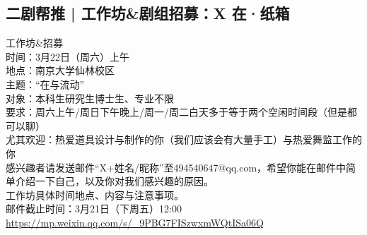 \documentclass[letterpaper, 12pt]{article}
\begin{document}
\begin{multicols}{2}
\subsection{二剧帮推 | 工作坊&剧组招募：X 在·纸箱}
工作坊&招募\\
时间：3月22日（周六）上午\\
地点：南京大学仙林校区\\
主题：“在与流动”\\
对象：本科生研究生博士生、专业不限\\
要求：周六上午/周日下午晚上/周一/周二白天多于等于两个空闲时间段（但是都可以聊）\\
尤其欢迎：热爱道具设计与制作的你（我们应该会有大量手工）与热爱舞监工作的你\\
感兴趣者请发送邮件“X+姓名/昵称”至494540647@qq.com，希望你能在邮件中简单介绍一下自己，以及你对我们感兴趣的原因。\\
工作坊具体时间地点、内容与注意事项。\\
邮件截止时间：3月21日（下周五）12:00\\
\url{https://mp.weixin.qq.com/s/_9PBG7FISzwxmWQtISa06Q}
\end{multicols}
\end{document}
